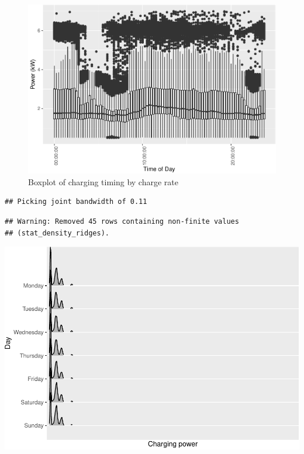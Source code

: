 \documentclass[]{article}
\begin{document}
\begin{figure}
\centering
\includegraphics{EVBB_report_files/figure-latex/boxplotCharging-1.pdf}
\caption{\label{fig:boxplotCharging}Boxplot of charging timing by charge
rate}
\end{figure}

\begin{verbatim}
## Picking joint bandwidth of 0.11
\end{verbatim}

\begin{verbatim}
## Warning: Removed 45 rows containing non-finite values
## (stat_density_ridges).
\end{verbatim}

\includegraphics{EVBB_report_files/figure-latex/joyplot-1.pdf}
\end{document}
